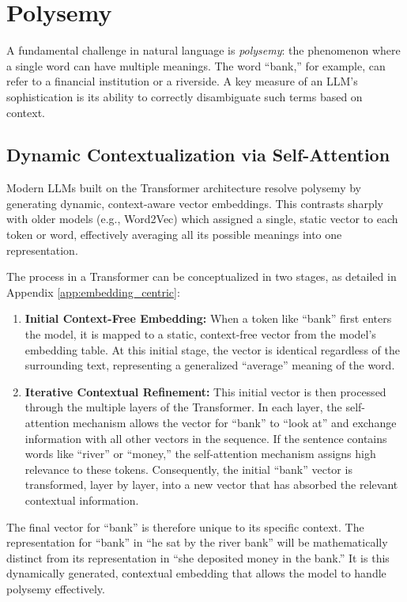 \documentclass[%
  reprint,
  superscriptaddress,
  showpacs,
  showkeys,
  amsmath,amssymb,
  pra,
  longbibliography,
  floatfix,
  x11names
]{revtex4-2}
\begin{document}

\section{Polysemy}
\label{section:Polysemy}

A fundamental challenge in natural language is \textit{polysemy}: the phenomenon where a single word can have multiple meanings. The word ``bank,'' for example, can refer to a financial institution or a riverside. A key measure of an LLM's sophistication is its ability to correctly disambiguate such terms based on context.

\subsection{Dynamic Contextualization via Self-Attention}

Modern LLMs built on the Transformer architecture resolve polysemy by generating dynamic,
context-aware vector embeddings.
This contrasts sharply with older models (e.g., Word2Vec) which assigned a single, static vector to each token or word, effectively averaging all its possible meanings into one representation.

The process in a Transformer can be conceptualized in two stages, as detailed in Appendix \ref{app:embedding_centric}:
\begin{enumerate}
    \item \textbf{Initial Context-Free Embedding:} When a token like ``bank'' first enters the model, it is mapped to a static, context-free vector from the model's embedding table. At this initial stage, the vector is identical regardless of the surrounding text, representing a generalized ``average'' meaning of the word.
    \item \textbf{Iterative Contextual Refinement:} This initial vector is then processed through the multiple layers of the Transformer. In each layer, the self-attention mechanism allows the vector for ``bank'' to ``look at'' and exchange information with all other vectors in the sequence. If the sentence contains words like ``river'' or ``money,'' the self-attention mechanism assigns high relevance to these tokens. Consequently, the initial ``bank'' vector is transformed, layer by layer, into a new vector that has absorbed the relevant contextual information.
\end{enumerate}
The final vector for ``bank'' is therefore unique to its specific context. The representation for ``bank'' in ``he sat by the river bank'' will be mathematically distinct from its representation in ``she deposited money in the bank.'' It is this dynamically generated, contextual embedding that allows the model to handle polysemy effectively.
\end{document}
